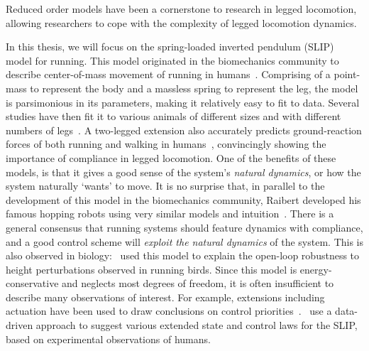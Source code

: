 Reduced order models have been a cornerstone to research in legged locomotion, allowing researchers to cope with the complexity of legged locomotion dynamics. \par
In this thesis, we will focus on the spring-loaded inverted pendulum (SLIP) model for running. This model originated in the biomechanics community to describe center-of-mass movement of running in humans~\cite{blickhan1989spring}. Comprising of a point-mass to represent the body and a massless spring to represent the leg, the model is parsimonious in its parameters, making it relatively easy to fit to data.
Several studies have then fit it to various animals of different sizes and with different numbers of legs~\cite{blickhan1993similarity,daley2006running,jindrich2002dynamic}. A two-legged extension also accurately predicts ground-reaction forces of both running and walking in humans~\cite{geyer2006compliant}, convincingly showing the importance of compliance in legged locomotion.
One of the benefits of these models, is that it gives a good sense of the system's \emph{natural dynamics}, or how the system naturally `wants' to move.
It is no surprise that, in parallel to the development of this model in the biomechanics community, Raibert developed his famous hopping robots using very similar models and intuition~\cite[See Figure 2.5]{raibert1986legged}.
There is a general consensus that running systems should feature dynamics with compliance, and a good control scheme will \emph{exploit the natural dynamics} of the system.
This is also observed in biology:~\textcite{daley2006running} used this model to explain the open-loop robustness to height perturbations observed in running birds.
Since this model is energy-conservative and neglects most degrees of freedom, it is often insufficient to describe many observations of interest. For example, extensions including actuation have been used to draw conclusions on control priorities~\cite{Birn-Jeffery3786,blum2014swing}.~\textcite{maus2015constructing} use a data-driven approach to suggest various extended state and control laws for the SLIP, based on experimental observations of humans. %

